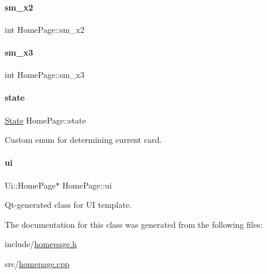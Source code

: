 \paragraph{\texorpdfstring{sm\_x2}{sm\_x2}}
{\footnotesize\ttfamily int Home\+Page\+::sm\+\_\+x2\hspace{0.3cm}{\ttfamily [private]}}

\mbox{\label{classHomePage_abd248b510f44173183825ee3f05f2604}} 
\paragraph{\texorpdfstring{sm\_x3}{sm\_x3}}
{\footnotesize\ttfamily int Home\+Page\+::sm\+\_\+x3\hspace{0.3cm}{\ttfamily [private]}}

\mbox{\label{classHomePage_a99cf5c5d03a03747ea209a27555f5687}} 
\paragraph{\texorpdfstring{state}{state}}
{\footnotesize\ttfamily \mbox{\hyperlink{datatypes_8h_a5d74787dedbc4e11c1ab15bf487e61f8}{State}} Home\+Page\+::state\hspace{0.3cm}{\ttfamily [private]}}



Custom enum for determining current card. 

\mbox{\label{classHomePage_ae5f1197f0c3aa11acf90d036ae4f91c7}} 
\paragraph{\texorpdfstring{ui}{ui}}
{\footnotesize\ttfamily Ui\+::\+Home\+Page$\ast$ Home\+Page\+::ui\hspace{0.3cm}{\ttfamily [private]}}



Qt-\/generated class for UI template. 



The documentation for this class was generated from the following files\+:\begin{DoxyCompactItemize}
\item 
include/\mbox{\hyperlink{homepage_8h}{homepage.\+h}}\item 
src/\mbox{\hyperlink{homepage_8cpp}{homepage.\+cpp}}\end{DoxyCompactItemize}
